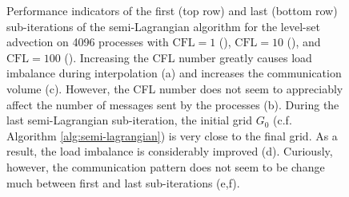 \begin{figure}[htbp]
\begin{center}
	\end{center}
	\caption{Performance indicators of the first (top row) and last (bottom row) sub-iterations of the semi-Lagrangian algorithm for the level-set advection on 4096 processes with $\text{CFL} = 1$ (), $\text{CFL} = 10$ (), and $\text{CFL} = 100$ (). Increasing the CFL number greatly causes load imbalance during interpolation (a) and increases the communication volume (c). However, the CFL number does not seem to appreciably affect the number of messages sent by the processes (b). During the last semi-Lagrangian sub-iteration, the initial grid $G_0$ (c.f. Algorithm \ref{alg:semi-lagrangian}) is very close to the final grid. As a result, the load imbalance is considerably improved (d). Curiously, however, the communication pattern does not seem to be change much between first and last sub-iterations (e,f).}
	\label{fig:communication_4096}
\end{figure}

